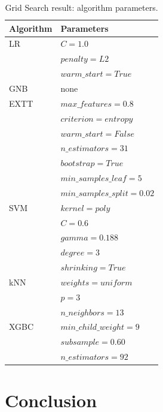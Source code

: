 \begin{table}[h]
\centering
\caption{Grid Search result: algorithm parameters.}
\label{tab:params}
\begin{tabular}{| l | l |}
\hline
Algorithm & Parameters \\ \hline 
LR        & $C=1.0$ \\ 
          & $penalty=L2$ \\
          & $warm\_start=True$ \\ \hline
GNB       & none \\ \hline
EXTT      & $max\_features=0.8$ \\ 
          & $criterion=entropy$ \\
          & $warm\_start=False$ \\
          & $n\_estimators=31$ \\
          & $bootstrap=True$ \\
          & $min\_samples\_leaf=5$ \\ 
          & $min\_samples\_split=0.02$ \\ \hline
SVM       & $kernel=poly$ \\
          & $C=0.6$ \\
          & $gamma=0.188$ \\ 
          & $degree=3$ \\
          & $shrinking=True$ \\ \hline
kNN       & $weights=uniform$ \\
          & $p=3$ \\
          & $n\_neighbors=13$ \\ \hline
XGBC      & $min\_child\_weight=9 $ \\
          & $subsample=0.60$ \\ 
          & $n\_estimators=92$ \\
\hline
\end{tabular}
\end{table}

\section{Conclusion}\label{sec:con}
